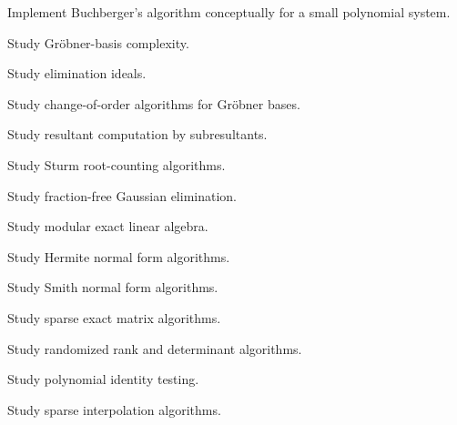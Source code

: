 \begin{exercise}[4]
Implement Buchberger's algorithm conceptually for a small polynomial
system.
\end{exercise}

\begin{exercise}[4]
Study Gröbner-basis complexity.
\end{exercise}

\begin{exercise}[4]
Study elimination ideals.
\end{exercise}

\begin{exercise}[4]
Study change-of-order algorithms for Gröbner bases.
\end{exercise}

\begin{exercise}[4]
Study resultant computation by subresultants.
\end{exercise}

\begin{exercise}[4]
Study Sturm root-counting algorithms.
\end{exercise}

\begin{exercise}[4]
Study fraction-free Gaussian elimination.
\end{exercise}

\begin{exercise}[4]
Study modular exact linear algebra.
\end{exercise}

\begin{exercise}[4]
Study Hermite normal form algorithms.
\end{exercise}

\begin{exercise}[4]
Study Smith normal form algorithms.
\end{exercise}

\begin{exercise}[4]
Study sparse exact matrix algorithms.
\end{exercise}

\begin{exercise}[4]
Study randomized rank and determinant algorithms.
\end{exercise}

\begin{exercise}[4]
Study polynomial identity testing.
\end{exercise}

\begin{exercise}[4]
Study sparse interpolation algorithms.
\end{exercise}

